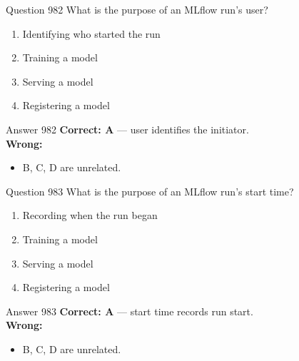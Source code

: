\documentclass[aspectratio=169,11pt]{beamer}
\begin{document}
	\begin{frame}{Question 982}
		What is the purpose of an MLflow run's user?
		\begin{enumerate}[label=\Alph*.]
			\item Identifying who started the run
			\item Training a model
			\item Serving a model
			\item Registering a model
		\end{enumerate}
	\end{frame}
	\begin{frame}{Answer 982}
		\textbf{Correct: A} --- user identifies the initiator.\\
		\vspace{0.5em}
		\textbf{Wrong:}
		\begin{itemize}
			\item B, C, D are unrelated.
		\end{itemize}
	\end{frame}
	
	\begin{frame}{Question 983}
		What is the purpose of an MLflow run's start time?
		\begin{enumerate}[label=\Alph*.]
			\item Recording when the run began
			\item Training a model
			\item Serving a model
			\item Registering a model
		\end{enumerate}
	\end{frame}
	\begin{frame}{Answer 983}
		\textbf{Correct: A} --- start time records run start.\\
		\vspace{0.5em}
		\textbf{Wrong:}
		\begin{itemize}
			\item B, C, D are unrelated.
		\end{itemize}
	\end{frame}
	
\end{document}
